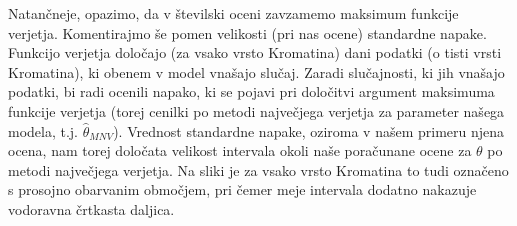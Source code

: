 \documentclass{article}
\begin{document}
Natančneje, opazimo, da v številski oceni zavzamemo maksimum funkcije verjetja.
\newline 
Komentirajmo še pomen velikosti (pri nas ocene) standardne napake. Funkcijo verjetja določajo (za vsako vrsto Kromatina) dani podatki (o tisti vrsti Kromatina), ki obenem v model vnašajo slučaj. 
Zaradi slučajnosti, ki jih vnašajo podatki, bi radi ocenili napako, ki se pojavi pri določitvi argument maksimuma funkcije verjetja (torej cenilki po metodi največjega verjetja za parameter našega modela, t.j. $\hat{\theta}_{MNV}$).
Vrednost standardne napake, oziroma v našem primeru njena ocena, nam torej določata velikost intervala okoli naše poračunane ocene za $\theta$ po metodi največjega verjetja. Na sliki je za vsako vrsto Kromatina to tudi označeno s prosojno obarvanim območjem, pri čemer meje intervala dodatno nakazuje vodoravna črtkasta daljica. 
\end{document}
